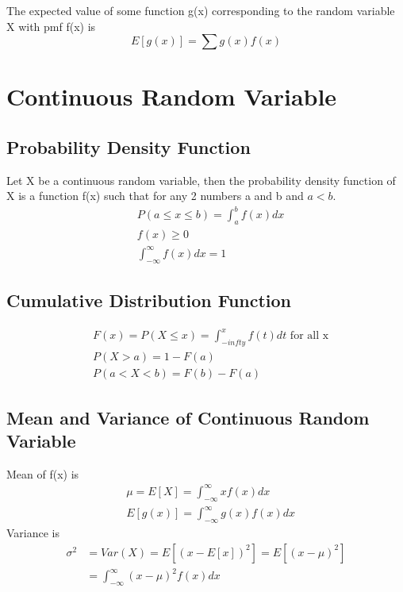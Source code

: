\documentclass{article}
\begin{document}
        The expected value of some function g(x) corresponding to the random variable X with pmf f(x) is 
        \begin{equation*}
            E[g(x)] = \sum g(x)f(x)
        \end{equation*}

    \section*{Continuous Random Variable}
    \subsection*{Probability Density Function}
    Let X be a continuous random variable, then the probability density function of X is a function f(x) such 
    that for any 2 numbers a and b and $a < b$.
    \begin{align*}
        &P(a \leq x \leq b) = \int_{a}^{b} f(x) dx\\
        &f(x) \geq 0\\
        &\int_{- \infty}^{\infty} f(x) dx = 1
    \end{align*}

    \subsection*{Cumulative Distribution Function}
    \begin{align*}
        &F(x) = P(X \leq x) = \int_{-infty}^{x}f(t)dt \text{ for all x}\\
        &P(X > a) = 1 - F(a)\\
        &P(a < X < b) = F(b) - F(a)
    \end{align*}
    \subsection*{Mean and Variance of Continuous Random Variable}
    Mean of f(x) is 
    \begin{align*}
        &\mu = E[X] = \int_{-\infty}^{\infty} x f(x) dx\\
        &E[g(x)] = \int_{-\infty}^{\infty} g(x) f(x) dx
    \end{align*}
    Variance is 
    \begin{align*}
        \sigma^{2} &= Var(X) = E[(x - E[x])^{2}] = E[(x - \mu)^{2}]\\
        & = \int_{-\infty}^{\infty} (x-\mu)^{2} f(x) dx
    \end{align*}
\end{document}
